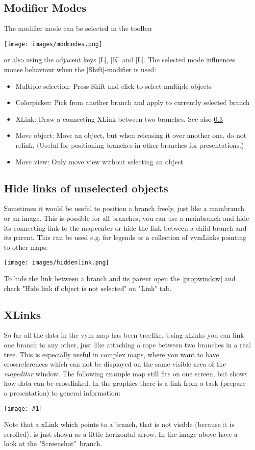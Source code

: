 \documentclass[12pt,a4paper]{article}
\newlength{\maximgwidth}
\newcommand{\maximage}[1]{  
    \begin{center}
        \texttt{[image: \#1]} 
    \end{center}
}
\newcommand{\vym}{{\sc vym }}
\newcommand{\key}[1]{[#1]}
\begin{document}
\subsection{Modifier Modes} 
The modifier mode can be selected in the toolbar
\begin{center}
    \texttt{[image: images/modmodes.png]}
\end{center}
or also using the adjacent keys \key{L}, \key{K} and \key{L}.
The selected mode influences mouse behaviour when the \key{Shift}-modifier is
used:
\begin{itemize}
    \item Multiple selection: Press Shift and click to select multiple objects
    \item Colorpicker: Pick from another branch and apply to currently
        selected branch
    \item XLink: Draw a connecting XLink between two branches. See also
        \ref{xlinks}
    \item Move object: Move an object, but when releasing it over another one, do not relink.
        (Useful for positioning branches in other branches for presentations.)
    \item Move view: Only move view without selecting an object
\end{itemize}

\subsection{Hide links of unselected objects} \label{hidelink}
Sometimes it would be useful to position a branch freely, just like a
mainbranch or an image. This is possible for all branches, you can use a
mainbranch and hide its connecting link to the mapcenter or hide the
link between a child branch and its parent. This can be used e.g. for
legends or a collection of vymLinks pointing to other maps:
\begin{center}
    \texttt{[image: images/hiddenlink.png]}
\end{center}
To hide the link between a branch and its parent open the
\ref{propwindow} and check "Hide link if object is not selected" on
"Link" tab.


\subsection{XLinks} \label{xlinks}
So far all the data in the \vym map has been treelike. Using xLinks you
can link one branch to any other, just like attaching a rope between two
branches in a real tree. This is especially useful in complex maps,
where you want to have crossreferences which can not be displayed on the
same visible area of the {\em mapeditor} window. The following example
map still fits on one screen, but shows how data can be crosslinked. In
the graphics there is a link from a task (prepare a presentation) to
general information: 
\maximage{images/xlink-control.png}
Note that a xLink which points to a branch, that is not visible (because
it is scrolled), is just shown as a little horizontal arrow. In the
image above have a look at the "Screenshot"\ branch.
\end{document}
